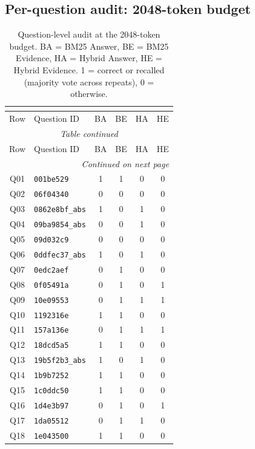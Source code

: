 \clearpage

\subsection{Per-question audit: 2048-token budget}

\begin{longtable}{@{}clcccc@{}}
\caption{Question-level audit at the 2048-token budget. BA = BM25 Answer, BE = BM25 Evidence, HA = Hybrid Answer, HE = Hybrid Evidence. 1 = correct or recalled (majority vote across repeats), 0 = otherwise.}\\
\label{tab:audit_2048}\\
\toprule
Row & Question ID & BA & BE & HA & HE \\
\midrule
\endfirsthead
\multicolumn{6}{c}{{\itshape Table \thetable{} continued}} \\[2pt]
\toprule Row & Question ID & BA & BE & HA & HE \\ \midrule
\endhead
\midrule \multicolumn{6}{r}{{\itshape Continued on next page}} \\
\endfoot
\bottomrule
\endlastfoot
Q01 & \texttt{001be529} & 1 & 1 & 0 & 0 \\
Q02 & \texttt{06f04340} & 0 & 0 & 0 & 0 \\
Q03 & \texttt{0862e8bf\_abs} & 1 & 0 & 1 & 0 \\
Q04 & \texttt{09ba9854\_abs} & 0 & 0 & 1 & 0 \\
Q05 & \texttt{09d032c9} & 0 & 0 & 0 & 0 \\
Q06 & \texttt{0ddfec37\_abs} & 1 & 0 & 1 & 0 \\
Q07 & \texttt{0edc2aef} & 0 & 1 & 0 & 0 \\
Q08 & \texttt{0f05491a} & 0 & 1 & 0 & 1 \\
Q09 & \texttt{10e09553} & 0 & 1 & 1 & 1 \\
Q10 & \texttt{1192316e} & 1 & 1 & 0 & 0 \\
Q11 & \texttt{157a136e} & 0 & 1 & 1 & 1 \\
Q12 & \texttt{18dcd5a5} & 1 & 1 & 0 & 0 \\
Q13 & \texttt{19b5f2b3\_abs} & 1 & 0 & 1 & 0 \\
Q14 & \texttt{1b9b7252} & 1 & 1 & 0 & 0 \\
Q15 & \texttt{1c0ddc50} & 1 & 1 & 0 & 0 \\
Q16 & \texttt{1d4e3b97} & 0 & 1 & 0 & 1 \\
Q17 & \texttt{1da05512} & 0 & 1 & 1 & 0 \\
Q18 & \texttt{1e043500} & 1 & 1 & 0 & 0 \\

\end{longtable}

